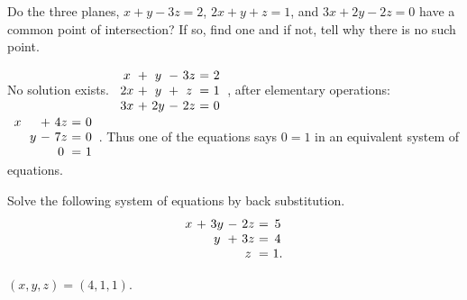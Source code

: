 \begin{ex}
  Do the three planes, $x+y-3z=2$, $2x+y+z=1$, and $3x+2y-2z=0$ have a
  common point of intersection? If so, find one and if not, tell why
  there is no such point.
  \begin{sol}
    No solution exists. $
    \begin{array}{c@{~}c@{~}c@{~}c@{~}c@{~}c@{~}c}
      x &+& y &-& 3z &=& 2 \\
      2x &+& y &+& z &=& 1 \\
      3x &+& 2y &-& 2z &=& 0
    \end{array}
    $, after elementary operations:
    $
    \begin{array}{c@{~}c@{~}c@{~}c@{~}c@{~}c@{~}c}
      x & &   &+& 4z &=& 0 \\
        & & y &-& 7z &=& 0 \\
        & &   & & 0 &=& 1
    \end{array}$.
    Thus one of the equations says $0=1$ in an equivalent system of
    equations.
  \end{sol}
\end{ex}

\begin{ex}
  Solve the following system of equations by back substitution.
  \begin{equation*}
    \begin{array}{c@{~}c@{~}c@{~}c@{~}c@{~}c@{~}c}
      x &+& 3y &-& 2z &=& 5 \\
        & & y  &+& 3z &=& 4 \\
        & &    & & z  &=& 1.
    \end{array}
  \end{equation*}

  \begin{sol}
    $(x,y,z) = (4,1,1)$.
  \end{sol}
\end{ex}

